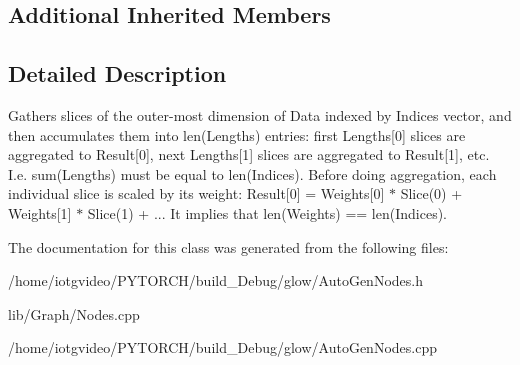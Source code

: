 \subsection*{Additional Inherited Members}


\subsection{Detailed Description}
Gathers slices of the outer-\/most dimension of Data indexed by Indices vector, and then accumulates them into len(\+Lengths) entries\+: first Lengths\mbox{[}0\mbox{]} slices are aggregated to Result\mbox{[}0\mbox{]}, next Lengths\mbox{[}1\mbox{]} slices are aggregated to Result\mbox{[}1\mbox{]}, etc. I.\+e. sum(\+Lengths) must be equal to len(\+Indices). Before doing aggregation, each individual slice is scaled by its weight\+: Result\mbox{[}0\mbox{]} = Weights\mbox{[}0\mbox{]} $\ast$ Slice(0) + Weights\mbox{[}1\mbox{]} $\ast$ Slice(1) + ... It implies that len(\+Weights) == len(\+Indices). 

The documentation for this class was generated from the following files\+:\begin{DoxyCompactItemize}
\item 
/home/iotgvideo/\+P\+Y\+T\+O\+R\+C\+H/build\+\_\+\+Debug/glow/Auto\+Gen\+Nodes.\+h\item 
lib/\+Graph/Nodes.\+cpp\item 
/home/iotgvideo/\+P\+Y\+T\+O\+R\+C\+H/build\+\_\+\+Debug/glow/Auto\+Gen\+Nodes.\+cpp\end{DoxyCompactItemize}
